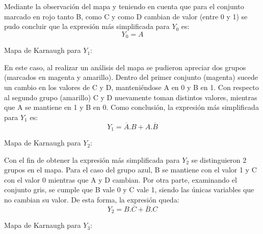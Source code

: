 \noindent
Mediante la observaci\'on del mapa y teniendo en cuenta que para el conjunto marcado en rojo tanto B, como C y como D cambian de valor (entre 0 y 1) se pudo concluir que la expresi\'on m\'as simplificada para $Y_0$ es:
\begin{equation}
    Y_0 = A
    \label{ecy0}
\end{equation}

\begin{center}
Mapa de Karnaugh para $Y_1$:

\begin{Karnaugh4}
    \centering
\end{Karnaugh4}
\end{center}

\noindent
En este caso, al realizar un an\'alisis del mapa se pudieron apreciar dos grupos (marcados en magenta y amarillo). Dentro del primer conjunto (magenta) sucede un cambio en los valores de C y D, manteni\'endose A en 0 y B en 1. Con respecto al segundo grupo (amarillo) C y D nuevamente toman distintos valores, mientras que A se mantiene en 1 y B en 0. Como conclusi\'on, la expresi\'on m\'as simplificada para $Y_1$ es: 
\begin{equation}
    Y_1 = \overline{A}.B
 + A.\overline{B}
 \label{ecy1}
\end{equation}

\begin{center}
Mapa de Karnaugh para $Y_2$:

\begin{Karnaugh4}
    \centering
\end{Karnaugh4}
\end{center}

\noindent
Con el fin de obtener la expresi\'on m\'as simplificada para $Y_2$ se distinguieron 2 grupos en el mapa. Para el caso del grupo azul, B se mantiene con el valor 1 y C con el valor 0 mientras que A y D cambian. Por otra parte, examinando el conjunto gris, se cumple que B vale 0 y C vale 1, siendo las \'unicas variables que no cambian su valor. De esta forma, la expresi\'on queda:
\begin{equation}
    Y_2 = B.\overline{C}
 + \overline{B}.C
 \label{ecy2}
\end{equation}
\begin{center}
Mapa de Karnaugh para $Y_3$:

\begin{Karnaugh4}
    \centering
\end{Karnaugh4}
\end{center}
\noindent

